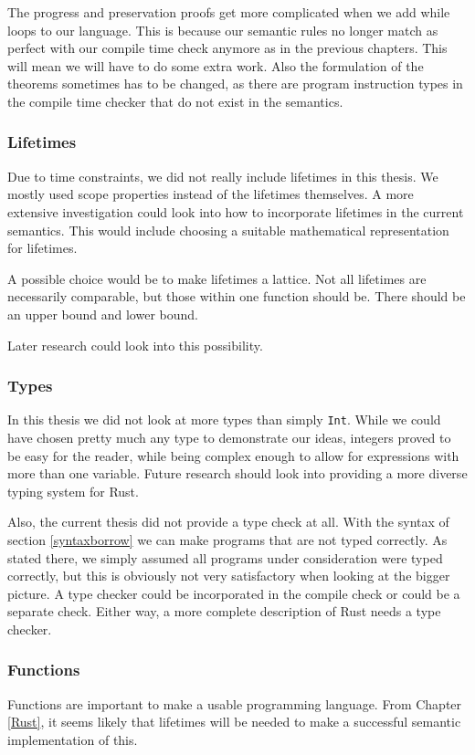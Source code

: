 The progress and preservation proofs get more complicated when we add while loops to our language. This is because our semantic rules no longer match as perfect with our compile time check anymore as in the previous chapters. This will mean we will have to do some extra work. Also the formulation of the theorems sometimes has to be changed, as there are program instruction types in the compile time checker that do not exist in the semantics. 

\subsubsection*{Lifetimes}
Due to time constraints, we did not really include lifetimes in this thesis. We mostly used scope properties instead of the lifetimes themselves. A more extensive investigation could look into how to incorporate lifetimes in the current semantics. This would include choosing a suitable mathematical representation for lifetimes. 

A possible choice would be to make lifetimes a lattice. Not all lifetimes are necessarily comparable, but those within one function should be. There should be an upper bound and lower bound. 

Later research could look into this possibility. 

\subsubsection*{Types}
In this thesis we did not look at more types than simply \texttt{Int}. While we could have chosen pretty much any type to demonstrate our ideas, integers proved to be easy for the reader, while being complex enough to allow for expressions with more than one variable. Future research should look into providing a more diverse typing system for Rust.

Also, the current thesis did not provide a type check at all. With the syntax of section \ref{syntaxborrow} we can make programs that are not typed correctly. As stated there, we simply assumed all programs under consideration were typed correctly, but this is obviously not very satisfactory when looking at the bigger picture. A type checker could be incorporated in the compile check or could be a separate check. Either way, a more complete description of Rust needs a type checker. 

\subsubsection*{Functions}
Functions are important to make a usable programming language. From Chapter \ref{Rust}, it seems likely that lifetimes will be needed to make a successful semantic implementation of this. 

